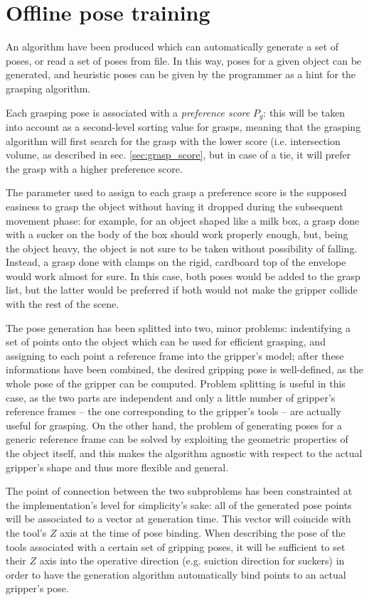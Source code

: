 \section{Offline pose training} \label{sec:pose-generation}
An algorithm have been produced which can automatically generate a set of
poses, or read a set of poses from file. In this way, poses for a given object
can be generated, and heuristic poses can be given by the programmer as a hint
for the grasping algorithm.  

Each grasping pose is associated with a \emph{preference score} $P_{g}$: this will be taken
into account as a second-level sorting value for grasps, meaning that the
grasping algorithm will first search for the grasp with the lower score (i.e.
intersection volume, as described in sec. \ref{sec:grasp_score}, but in case of
a tie, it will prefer the grasp with a higher preference score.

The parameter used to assign to each grasp a preference score is the supposed
easiness to grasp the object without having it dropped during the subsequent
movement phase: for example, for an object shaped like a milk box, a
grasp done with a sucker on the body of the box
should work properly enough, but, being the object heavy, the
object is not sure to be taken without possibility of falling. Instead, a grasp
done with clamps on the rigid, cardboard top of the envelope would work almost
for sure. In this case, both poses would be added to the grasp list, but the
latter would be preferred if both would not make the gripper collide with the
rest of the scene.

The pose generation has been splitted into two, minor problems: indentifying a
set of points onto the object which can be used for efficient grasping, and
assigning to each point a reference frame into the gripper's model; after these
informations have been combined, the desired gripping pose is well-defined, as the
whole pose of the gripper can be computed. Problem splitting is useful in this
case, as the two parts are independent and only a little number of gripper's
reference frames -- the one corresponding to the gripper's tools -- are actually
useful for grasping. On the other hand, the problem of  generating poses for a generic
reference frame can be solved by exploiting the geometric properties of the
object itself, and this makes the algorithm agnostic with respect to the actual
gripper's shape and thus more flexible and general.

The point of connection between the two subproblems has been constrainted at the
implementation's level for simplicity's sake: all of the generated pose
points will be associated to a vector at generation time. This vector will
coincide with the tool's $Z$ axis at the time of pose binding. When describing
the pose of the tools associated with a certain set of gripping poses, it will
be sufficient to set their $Z$ axis into the operative direction (e.g. suiction
direction for suckers) in order to have the generation algorithm automatically
bind points to an actual gripper's pose.

